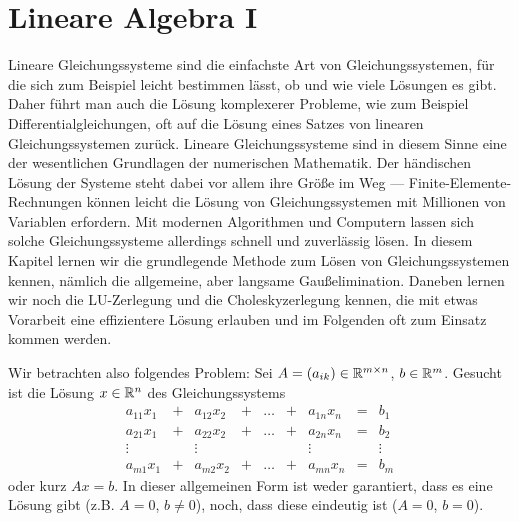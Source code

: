 % 
\chapter{Lineare Algebra \textrm{I}}

Lineare Gleichungssysteme sind die einfachste Art von
Gleichungssystemen, für die sich zum Beispiel leicht bestimmen lässt,
ob und wie viele Lösungen es gibt. Daher führt man auch die Lösung
komplexerer Probleme, wie zum Beispiel Differentialgleichungen, oft
auf die Lösung eines Satzes von linearen Gleichungssystemen
zurück. Lineare Gleichungssysteme sind in diesem Sinne eine der
wesentlichen Grundlagen der numerischen Mathematik. Der händischen
Lösung der Systeme steht dabei vor allem ihre Größe im Weg ---
Finite-Elemente-Rechnungen können leicht die Lösung von
Gleichungssystemen mit Millionen von Variablen erfordern. Mit modernen
Algorithmen und Computern lassen sich solche Gleichungssysteme
allerdings schnell und zuverlässig lösen. In diesem Kapitel lernen wir
die grundlegende Methode zum Lösen von Gleichungssystemen kennen,
nämlich die allgemeine, aber langsame Gaußelimination. Daneben lernen
wir noch die LU-Zerlegung und die Choleskyzerlegung kennen, die mit
etwas Vorarbeit eine effizientere Lösung erlauben und im Folgenden oft
zum Einsatz kommen werden.

Wir betrachten also folgendes Problem: Sei $A=(a_{ik})\in\mathbb{R}^{m\times
  n}$, $b\in\mathbb{R}^m$. Gesucht ist die Lösung $x\in\mathbb{R}^n$ des
Gleichungssystems
\begin{equation}
  \label{eq:lgs}
  \begin{matrix}
    a_{11}x_1 &+&  a_{12}x_2 &+& \ldots &+& a_{1n}x_n &=& b_1\\
    a_{21}x_1 &+&  a_{22}x_2 &+& \ldots &+& a_{2n}x_n &=& b_2\\
    \vdots   &&   \vdots   &&         && \vdots  && \vdots\\
    a_{m1}x_1 &+&  a_{m2}x_2 &+& \ldots &+& a_{mn}x_n &=& b_m
  \end{matrix}
\end{equation}
oder kurz $Ax=b$. In dieser allgemeinen Form ist weder garantiert,
dass es eine Lösung gibt (z.B. $A=0$, $b\neq 0$), noch, dass diese
eindeutig ist ($A=0$, $b=0$).

